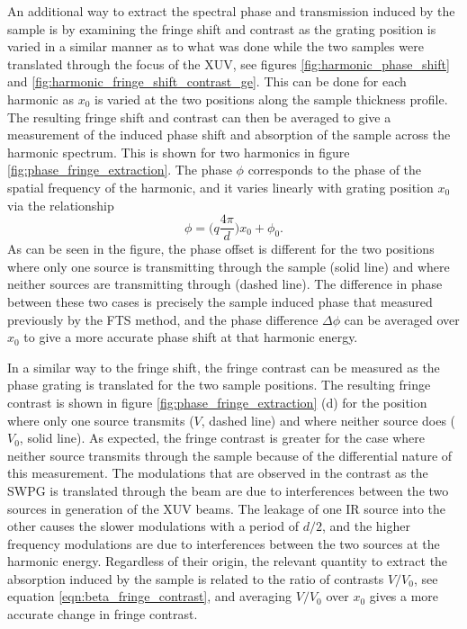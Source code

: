 An additional way to extract the spectral phase and transmission induced by the sample is by examining the fringe shift and contrast as the grating position is varied in a similar manner as to what was done while the two samples were translated through the focus of the XUV, see figures \ref{fig:harmonic_phase_shift} and \ref{fig:harmonic_fringe_shift_contrast_ge}.  This can be done for each harmonic as $x_0$ is varied at the two positions along the sample thickness profile.  The resulting fringe shift and contrast can then be averaged to give a measurement of the induced phase shift and absorption of the sample across the harmonic spectrum.  This is shown for two harmonics in figure \ref{fig:phase_fringe_extraction}.  The phase $\phi$ corresponds to the phase of the spatial frequency of the harmonic, and it varies linearly with grating position $x_0$ via the relationship
\begin{equation}
	\phi=\bigg(q\frac{4\pi}{d}\bigg)x_0 + \phi_0.
\end{equation} 
As can be seen in the figure, the phase offset is different for the two positions where only one source is transmitting through the sample (solid line) and where neither sources are transmitting through (dashed line).  The difference in phase between these two cases is precisely the sample induced phase that measured previously by the FTS method, and the phase difference $\Delta\phi$ can be averaged over $x_0$ to give a more accurate phase shift at that harmonic energy. 

In a similar way to the fringe shift, the fringe contrast can be measured as the phase grating is translated for the two sample positions. The resulting fringe contrast is shown in figure \ref{fig:phase_fringe_extraction} (d) for the position where only one source transmits ($V$, dashed line) and where neither source does ($V_0$, solid line).  As expected, the fringe contrast is greater for the case where neither source transmits through the sample because of the differential nature of this measurement.  The modulations that are observed in the contrast as the SWPG is translated through the beam are due to interferences between the two sources in generation of the XUV beams.  The leakage of one IR source into the other causes the slower modulations with a period of $d/2$, and the higher frequency modulations are due to interferences between the two sources at the harmonic energy.  Regardless of their origin, the relevant quantity to extract the absorption induced by the sample is related to the ratio of contrasts $V/V_0$, see equation \ref{eqn:beta_fringe_contrast}, and averaging $V/V_0$ over $x_0$ gives a more accurate change in fringe contrast. 


